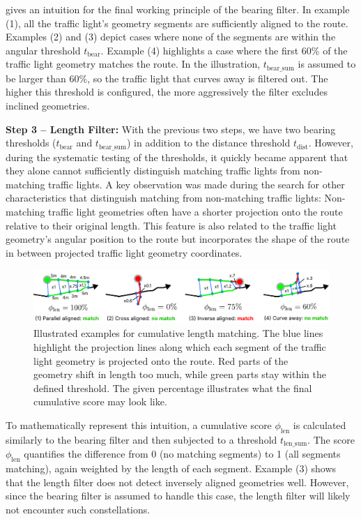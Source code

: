  gives an intuition for the final working principle of the bearing filter. In example (1), all the traffic light's geometry segments are sufficiently aligned to the route. Examples (2) and (3) depict cases where none of the segments are within the angular threshold $t_{\text{bear}}$. Example (4) highlights a case where the first 60\% of the traffic light geometry matches the route. In the illustration, $t_{\text{bear\_sum}}$ is assumed to be larger than 60\%, so the traffic light that curves away is filtered out. The higher this threshold is configured, the more aggressively the filter excludes inclined geometries.

\textbf{\color{cidarkblue}Step 3 -- Length Filter:} With the previous two steps, we have two bearing thresholds ($t_{\text{bear}}$ and $t_{\text{bear\_sum}}$) in addition to the distance threshold $t_{\text{dist}}$. However, during the systematic testing of the thresholds, it quickly became apparent that they alone cannot sufficiently distinguish matching traffic lights from non-matching traffic lights. A key observation was made during the search for other characteristics that distinguish matching from non-matching traffic lights: Non-matching traffic light geometries often have a shorter projection onto the route relative to their original length. This feature is also related to the traffic light geometry's angular position to the route but incorporates the shape of the route in between projected traffic light geometry coordinates.

\begin{figure}[t]
\centering
\includegraphics[width=\linewidth]{images/sg-selection-length-filter-sum.pdf}
\caption{Illustrated examples for cumulative length matching. The blue lines highlight the projection lines along which each segment of the traffic light geometry is projected onto the route. Red parts of the geometry shift in length too much, while green parts stay within the defined threshold. The given percentage illustrates what the final cumulative score may look like.}
\label{fig:sg-selection-length-filter-sum}
\end{figure}

To mathematically represent this intuition, a cumulative score $\phi_{\text{len}}$ is calculated similarly to the bearing filter and then subjected to a threshold $t_{\text{len\_sum}}$. The score $\phi_{\text{len}}$ quantifies the difference from 0 (no matching segments) to 1 (all segments matching), again weighted by the length of each segment. Example (3) shows that the length filter does not detect inversely aligned geometries well. However, since the bearing filter is assumed to handle this case, the length filter will likely not encounter such constellations.

